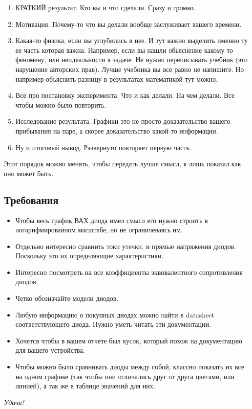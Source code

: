 \documentclass[a4paper,12pt]{article} %
\begin{document}
\begin{enumerate}
  \item КРАТКИЙ результат. Кто вы и что сделали. Сразу и громко.
  \item Мотивация. Почему-то что вы делали вообще заслуживает вашего времени.
  \item Какая-то физика, если вы углубились в нее. И тут важно выделить именно ту ее часть которая важна. Например, если вы нашли обьяснение какому то феномену, или неидеальности в задаче. Не нужно переписывать учебник (это нарушение авторских прав). Лучше учебника вы все равно не напишите. Но например объяснить разницу в результатах математикой тут можно.
  \item Все про постановку эксперимента. Что и как делали. На чем делали. Все чтобы можно было повторить.
  \item Исследование результата. Графики это не просто доказательство вашего прибывания на паре, а скорее доказательство какой-то информации.
  \item Ну и итоговый вывод. Развернуто повторяет первую часть.
\end{enumerate}
Этот порядок можно менять, чтобы передать лучше смысл, я лишь показал как оно может быть.


\subsection{Требования}
\begin{itemize}
  \item Чтобы весь график ВАХ диода имел смысл его нужно строить в логарифмированном масштабе, но не ограничеваясь им.
  \item Отдельно интересно сравнить токи утечки, и прямые напряжения диодов. Поскольку это их определяющие характеристики.
  \item Интересно посмотреть на все коэффициенты эквивалентного сопротивления диодов.
  \item Четко обозначайте модели диодов.
  \item Любую информацию о покупных диодах можно найти в datasheet соответствующего диода. Нужно уметь читать эти документации.
  \item Хочется чтобы в вашем отчете был кусок, который похож на документацию для вашего устройства.
  \item Чтобы можно было сравнивать диоды между собой, классно показать их все на одном графике (так чтобы они отличались друг от друга цветами, или линией), а так же в таблице значений для них.
\end{itemize}


\textit{Удачи!} 
\end{document}
